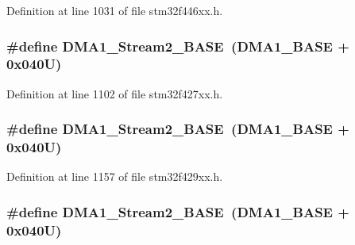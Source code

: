 Definition at line 1031 of file stm32f446xx.\+h.

\subsubsection[{\texorpdfstring{D\+M\+A1\+\_\+\+Stream2\+\_\+\+B\+A\+SE}{DMA1_Stream2_BASE}}]{\setlength{\rightskip}{0pt plus 5cm}\#define D\+M\+A1\+\_\+\+Stream2\+\_\+\+B\+A\+SE~({\bf D\+M\+A1\+\_\+\+B\+A\+SE} + 0x040\+U)}\hypertarget{group___peripheral__memory__map_ga48a551ee91d3f07dd74347fdb35c703d}{}\label{group___peripheral__memory__map_ga48a551ee91d3f07dd74347fdb35c703d}


Definition at line 1102 of file stm32f427xx.\+h.

\subsubsection[{\texorpdfstring{D\+M\+A1\+\_\+\+Stream2\+\_\+\+B\+A\+SE}{DMA1_Stream2_BASE}}]{\setlength{\rightskip}{0pt plus 5cm}\#define D\+M\+A1\+\_\+\+Stream2\+\_\+\+B\+A\+SE~({\bf D\+M\+A1\+\_\+\+B\+A\+SE} + 0x040\+U)}\hypertarget{group___peripheral__memory__map_ga48a551ee91d3f07dd74347fdb35c703d}{}\label{group___peripheral__memory__map_ga48a551ee91d3f07dd74347fdb35c703d}


Definition at line 1157 of file stm32f429xx.\+h.

\subsubsection[{\texorpdfstring{D\+M\+A1\+\_\+\+Stream2\+\_\+\+B\+A\+SE}{DMA1_Stream2_BASE}}]{\setlength{\rightskip}{0pt plus 5cm}\#define D\+M\+A1\+\_\+\+Stream2\+\_\+\+B\+A\+SE~({\bf D\+M\+A1\+\_\+\+B\+A\+SE} + 0x040\+U)}\hypertarget{group___peripheral__memory__map_ga48a551ee91d3f07dd74347fdb35c703d}{}\label{group___peripheral__memory__map_ga48a551ee91d3f07dd74347fdb35c703d}


